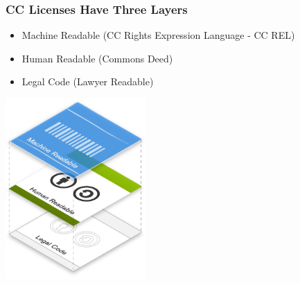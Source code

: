 \documentclass[mathserif,xcolor=dvipsnames,hyperref={bookmarks=true}]{beamer}
\begin{document}
    \begin{frame}[t]
        \frametitle{CC Licenses Have Three Layers}
            \begin{itemize}
                \item<2-> Machine Readable (CC Rights Expression Language - CC REL)
                \item<3-> Human Readable (Commons Deed)
                \item<4-> Legal Code (Lawyer Readable)
            \end{itemize}
        \begin{center}
          \includegraphics[width=0.4\textwidth]{license_layers.png}
        \end{center}
    \end{frame}
\end{document}
